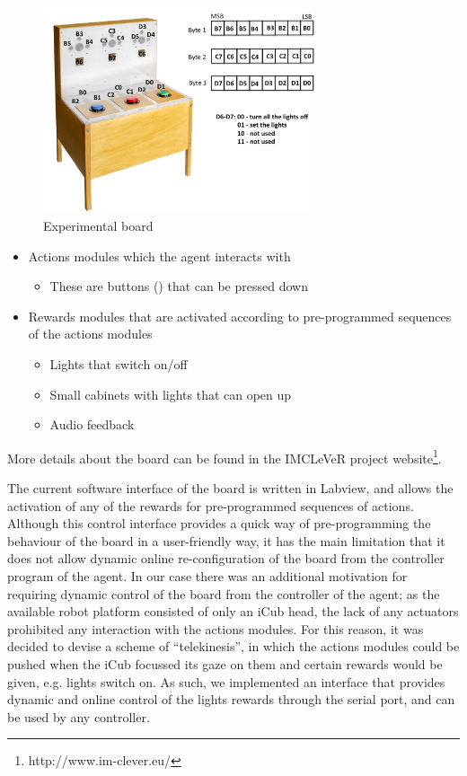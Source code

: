 \documentclass[conference]{IEEEtran}
\begin{document}
\begin{figure}[htb]
\begin{center}
\includegraphics[width=8cm]{lights.jpg}
\end{center}
\caption{Experimental board}
\label{fig:experimental_board}
\end{figure}


\begin{itemize}
\item Actions modules which the agent interacts with
\begin{itemize}
\item These are buttons () that can be pressed down
\end{itemize}
\item Rewards modules that are activated according to pre-programmed
  sequences of the actions modules
\begin{itemize}
\item Lights that switch on/off
\item Small cabinets with lights that can open up
\item Audio feedback
\end{itemize}
\end{itemize}

More details about the board can be found in the IMCLeVeR project
website\footnote{http://www.im-clever.eu/}.

The current software interface of the board is written in Labview, and
allows the activation of any of the rewards for pre-programmed
sequences of actions. Although this control interface provides a quick
way of pre-programming the behaviour of the board in a user-friendly
way, it has the main limitation that it does not allow dynamic online
re-configuration of the board from the controller program of the
agent. In our case there was an additional motivation for requiring
dynamic control of the board from the controller of the agent; as the
available robot platform consisted of only an iCub head, the lack of
any actuators prohibited any interaction with the actions modules. For
this reason, it was decided to devise a scheme of ``telekinesis'', in
which the actions modules could be pushed when the iCub focussed its
gaze on them and certain rewards would be given, e.g. lights switch
on. As such, we implemented an interface that provides dynamic and
online control of the lights rewards through the serial port, and can
be used by any controller.
\end{document}
